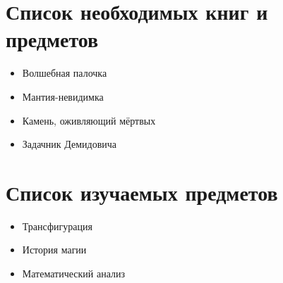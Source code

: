 \documentclass[14pt, a4paper]{article}
\begin{document}
\newpage 

\section{Список необходимых книг и предметов} 

\begin{itemize}
\item Волшебная палочка
\item Мантия-невидимка
\item Камень, оживляющий мёртвых
\item Задачник Демидовича
\end{itemize}

\newpage
 
\section{ Список изучаемых предметов} 

\begin{itemize}
\item Трансфигурация
\item История магии
\item Математический анализ
\end{itemize}
\end{document}
